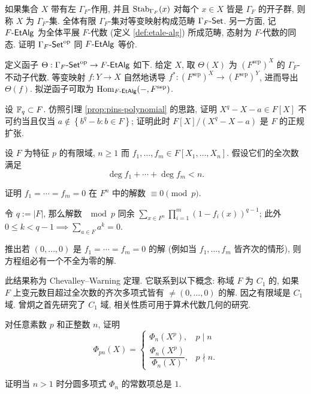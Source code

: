 \begin{Exercises}
	\item 如果集合 $X$ 带有左 $\Gamma_F$-作用, 并且 $\operatorname{Stab}_{\Gamma_F}(x)$ 对每个 $x \in X$ 皆是 $\Gamma_F$ 的开子群, 则称 $X$ 为 $\Gamma_F$-集. 全体有限 $\Gamma_F$-集对等变映射构成范畴 $\Gamma_F\text{-}\mathsf{Set}$. 另一方面, 记 $F\text{-}\mathsf{EtAlg}$ 为全体平展 $F$-代数 (定义 \ref{def:etale-alg}) 所成范畴, 态射为 $F$-代数的同态. 证明 $\Gamma_F\text{-}\mathsf{Set}^\text{op}$ 同 $F\text{-}\mathsf{EtAlg}$ 等价.
	\begin{hint}
		定义函子 $\Theta: \Gamma_F\text{-}\mathsf{Set}^\text{op} \to F\text{-}\mathsf{EtAlg}$ 如下. 给定 $X$, 取 $\Theta(X)$ 为 $(F^\text{sep})^X$ 的 $\Gamma_F$-不动子代数. 等变映射 $f: Y \to X$ 自然地诱导 $f^*: (F^\text{sep})^X \to (F^\text{sep})^Y$, 进而导出 $\Theta(f)$. 拟逆函子可取为 $\operatorname{Hom}_{F\text{-}\mathsf{EtAlg}}(-, F^\text{sep})$.
	\end{hint}
	\item 设 $\mathbb{F}_q \subset F$. 仿照引理 \ref{prop:pins-polynomial} 的思路, 证明 $X^q - X - a \in F[X]$ 不可约当且仅当 $a \notin \left\{b^q -b : b \in F\right\}$; 证明此时 $F[X]/(X^q-X-a)$ 是 $F$ 的正规扩张.
	\item 设 $F$ 为特征 $p$ 的有限域, $n \geq 1$ 而 $f_1, \ldots, f_m \in F[X_1, \ldots, X_n]$. 假设它们的全次数满足
		\[ \deg f_1 + \cdots + \deg f_m < n. \]
		\begin{compactenum}[(i)]
			\item 证明 $f_1 = \cdots = f_m = 0$ 在 $F^n$ 中的解数 $\equiv 0 \pmod p$.
			\begin{hint}
				令 $q := |F|$, 那么解数 $\mod p$ 同余 $\sum_{x \in F^n} \prod_{i=1}^m \left( 1 - f_i(x) \right)^{q-1}$; 此外 $0 \leq k < q-1 \implies \sum_{a \in F} a^k = 0$.
			\end{hint}
			\item 推出若 $(0, \ldots, 0)$ 是 $f_1 = \cdots = f_m = 0$ 的解 (例如当 $f_1, \ldots, f_m$ 皆齐次的情形), 则方程组必有一个不全为零的解.
		\end{compactenum}
		此结果称为 Chevalley--Warning 定理. 它联系到以下概念: 称域 $F$ 为 $C_1$ 的, 如果 $F$ 上变元数目超过全次数的齐次多项式皆有 $\neq (0, \ldots, 0)$ 的解. 因之有限域是 $C_1$ 域. 曾炯之首先研究了 $C_1$ 域, 相关性质可用于算术代数几何的研究.
	\item 对任意素数 $p$ 和正整数 $n$, 证明
		\[ \Phi_{pn}(X) = \begin{cases} \Phi_n(X^p), & p \mid n \\ \dfrac{\Phi_n(X^p)}{\Phi_n(X)}, & p \nmid n. \end{cases} \]
	\item 证明当 $n > 1$ 时分圆多项式 $\Phi_n$ 的常数项总是 $1$.

\end{Exercises}
